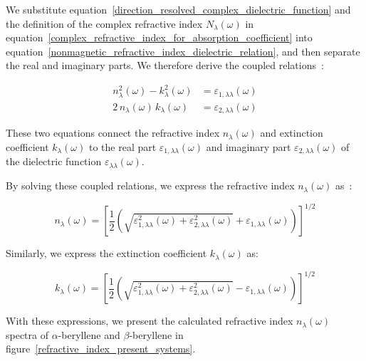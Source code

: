 We substitute equation~\eqref{direction_resolved_complex_dielectric_function}
and the definition of the complex refractive index $N_{\lambda}(\omega)$ in equation~\eqref{complex_refractive_index_for_absorption_coefficient}
into equation~\eqref{nonmagnetic_refractive_index_dielectric_relation},
and then separate the real and imaginary parts.
We therefore derive the coupled relations~\cite{wooten2013optical,dressel2002electrodynamics,fox2010optical}:

\begin{equation}
\begin{aligned}
    n_{\lambda}^{2}(\omega)-k_{\lambda}^{2}(\omega)
    &= \varepsilon_{1,\lambda\lambda}(\omega) \\
    2\,n_{\lambda}(\omega)\,k_{\lambda}(\omega)
    &= \varepsilon_{2,\lambda\lambda}(\omega)
\end{aligned}
\label{refractive_index_extinction_coefficient_auxiliary_relations}
\end{equation}

These two equations connect the refractive index $n_{\lambda}(\omega)$ and extinction coefficient $k_{\lambda}(\omega)$ to the real part $\varepsilon_{1,\lambda\lambda}(\omega)$ and imaginary part $\varepsilon_{2,\lambda\lambda}(\omega)$ of the dielectric function $\varepsilon_{\lambda\lambda}(\omega)$.

By solving these coupled relations,
we express the refractive index $n_{\lambda}(\omega)$ as~\cite{capper2019optical,cheng2025two,kim2024hyperspectral}:

\begin{equation}
    n_{\lambda}(\omega) = 
    \left[\frac{1}{2}\left(\sqrt{\varepsilon_{1,\lambda\lambda}^{2}(\omega)
        + \varepsilon_{2,\lambda\lambda}^{2}(\omega)}
        + \varepsilon_{1,\lambda\lambda}(\omega)\right)\right]^{1/2}
\label{refractive_index_from_dielectric_response}
\end{equation}

Similarly, we express the extinction coefficient $k_{\lambda}(\omega)$ as:

\begin{equation}
    k_{\lambda}(\omega) =
    \left[\frac{1}{2}\left(\sqrt{\varepsilon_{1,\lambda\lambda}^{2}(\omega)
        + \varepsilon_{2,\lambda\lambda}^{2}(\omega)}
        - \varepsilon_{1,\lambda\lambda}(\omega)\right)\right]^{1/2}
\label{extinction_coefficient_from_dielectric_response}
\end{equation}

With these expressions, we present the calculated refractive index $n_{\lambda}(\omega)$ spectra of $\alpha$-beryllene and $\beta$-beryllene in figure~\ref{refractive_index_present_systems}.

